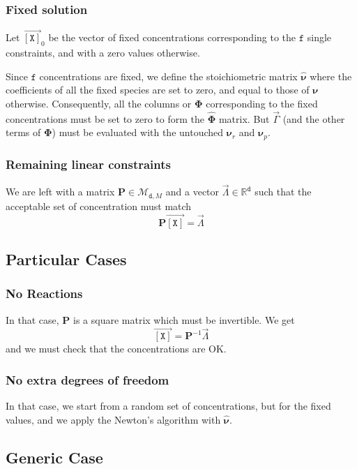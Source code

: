 \documentclass[aps,twocolumn]{revtex4}
\newcommand{\myconc}[1]{\left\lbrack #1 \right\rbrack}
\newcommand{\mychem}[1]{{\mathtt{#1}}}
\newcommand{\mymat}[1]{\boldsymbol{#1}}
\newcommand{\myvec}[1]{\overrightarrow{#1}}
\newcommand{\vecX}{\myvec{\myconc{\mychem{X}}}}
\newcommand{\dof}{\mathtt{d}}
\newcommand{\fixed}{\mathtt{f}}
\begin{document}
\subsubsection{Fixed solution}
Let $\vecX_0$ be the vector of fixed concentrations corresponding to the $\fixed$ single constraints, and with
a zero values otherwise.
	
Since $\fixed$ concentrations are fixed, we define the stoichiometric matrix $\hat{\mymat{\nu}}$
where the coefficients of all the fixed species are set to zero, and equal to those of $\mymat{\nu}$ otherwise.
Consequently, all the columns or $\mymat{\Phi}$ corresponding to the fixed concentrations must 
be set to zero to form the $\hat{\mymat{\Phi}}$ matrix. 
But $\vec{\Gamma}$ (and the other terms of $\mymat{\Phi}$) must be evaluated with
the untouched $\mymat{\nu}_r$ and $\mymat{\nu}_p$.

\subsubsection{Remaining linear constraints}
We are left with a matrix $\mymat{P}\in\mathcal{M}_{\dof,M}$ and a vector $\vec{\Lambda}\in\mathbb{R}^{\dof}$ such
that the acceptable set of concentration must match
\begin{equation}
	\mymat{P}\vecX = \vec{\Lambda}
\end{equation}

\subsection{Particular Cases}
\subsubsection{No Reactions}
In that case, $\mymat{P}$ is a square matrix which must be invertible.
We get
$$
	\vecX = \mymat{P}^{-1}\vec{\Lambda}
$$
and we must check that the concentrations are OK.

\subsubsection{No extra degrees of freedom}
In that case, we start from a random set of concentrations, but for the fixed values, and
we apply the Newton's algorithm with $\hat{\mymat{\nu}}$.

\subsection{Generic Case}
\end{document}
